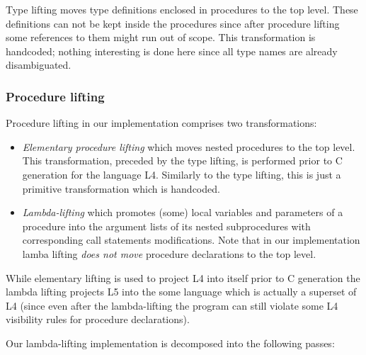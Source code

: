 Type lifting moves type definitions enclosed in procedures to the top level. These definitions can not be
kept inside the procedures since after procedure lifting some references to them might run out
of scope. This transformation is handcoded; nothing interesting is done here since all type names are 
already disambiguated.

\subsubsection{Procedure lifting}

Procedure lifting in our implementation comprises two transformations:

\begin{itemize}
\item \emph{Elementary procedure lifting} which moves nested procedures to the top level. This transformation, 
preceded by the type lifting, is performed prior to C generation for the language L4. Similarly to the type 
lifting, this is just a primitive transformation which is handcoded.

\item \emph{Lambda-lifting} which promotes (some) local variables and parameters of a procedure into the
argument lists of its nested subprocedures with corresponding call statements modifications. Note that in
our implementation lamba lifting \emph{does not move} procedure declarations to the top level.
\end{itemize}

While elementary lifting is used to project L4 into itself prior to C generation the lambda lifting
projects L5 into the some language which is actually a superset of L4 (since even after the lambda-lifting 
the program can still violate some L4 visibility rules for procedure declarations). 

Our lambda-lifting implementation is decomposed into the following passes:

